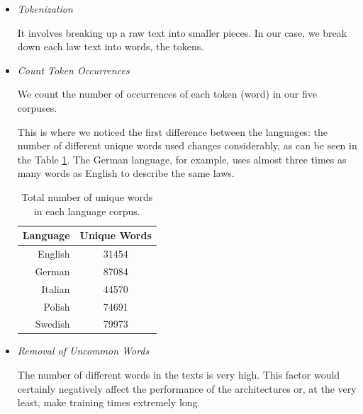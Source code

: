 \documentclass[letterpaper,11pt]{article}
\begin{document}
\begin{itemize}
  \item \textit{Tokenization}
  
  It involves breaking up a raw text into smaller pieces. In our case, we break down each law text into words, the tokens. 

  \item \textit{Count Token Occurrences}
  
  We count the number of occurrences of each token (word) in our five corpuses.

  This is where we noticed the first difference between the languages: the number of different unique words used changes considerably, as can be seen in the Table \ref{table:tot_words_for_corpuses}. The German language, for example, uses almost three times as many words as English to describe the same laws.

  \begin{table}[H]
    \centering
    \begin{tabular}{|r|c|}
    \hline
    \multicolumn{1}{|c|}{\textbf{Language}} & \multicolumn{1}{c|}{\textbf{Unique Words}} \\ \hline
    English                                 & 31454                                                            \\ \hline
    German                                  & 87084                                                            \\ \hline
    Italian                                 & 44570                                                            \\ \hline
    Polish                                  & 74691                                                            \\ \hline
    Swedish                                 & 79973                                                            \\ \hline
    \end{tabular}
    \caption{Total number of unique words in each language corpus.}
    \label{table:tot_words_for_corpuses}
  \end{table}


  \item \textit{Removal of Uncommon Words}
  
  The number of different words in the texts is very high. This factor would certainly negatively affect the performance of the architectures or, at the very least, make training times extremely long. 
  

\end{itemize}
\end{document}
